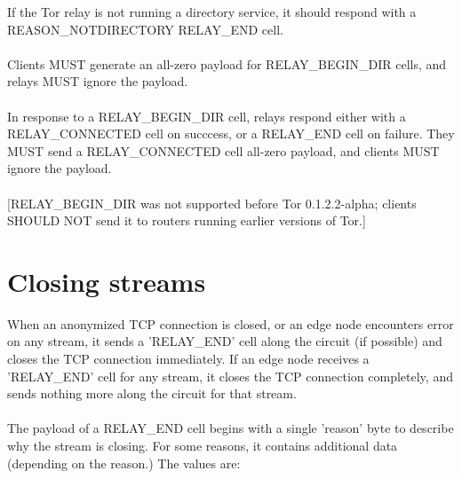 If the Tor relay is not running a directory service, it should respond
with a REASON\_NOTDIRECTORY RELAY\_END cell.

\paragraph{}
Clients MUST generate an all-zero payload for RELAY\_BEGIN\_DIR cells,
and relays MUST ignore the payload.

\paragraph{}
In response to a RELAY\_BEGIN\_DIR cell, relays respond either with a
RELAY\_CONNECTED cell on succcess, or a RELAY\_END cell on failure. They
MUST send a RELAY\_CONNECTED cell all-zero payload, and clients MUST ignore
the payload.

\paragraph{}
[RELAY\_BEGIN\_DIR was not supported before Tor 0.1.2.2-alpha; clients
SHOULD NOT send it to routers running earlier versions of Tor.]

\section{Closing streams}
When an anonymized TCP connection is closed, or an edge node
encounters error on any stream, it sends a 'RELAY\_END' cell along the
circuit (if possible) and closes the TCP connection immediately. If
an edge node receives a 'RELAY\_END' cell for any stream, it closes
the TCP connection completely, and sends nothing more along the
circuit for that stream.

\paragraph{}
The payload of a RELAY\_END cell begins with a single 'reason' byte to
describe why the stream is closing. For some reasons, it contains
additional data (depending on the reason.) The values are:

